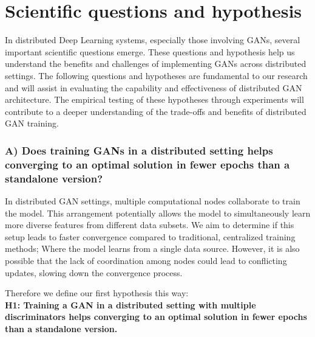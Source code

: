 \chapter{Scientific questions and hypothesis}
In distributed Deep Learning systems, especially those involving GANs, several important scientific questions emerge. These questions and hypothesis help us understand the benefits and challenges of implementing GANs across distributed settings. The following questions and hypotheses are fundamental to our research and will assist in evaluating the capability and effectiveness of distributed GAN architecture. The empirical testing of these hypotheses through experiments will contribute to a deeper understanding of the trade-offs and benefits of distributed GAN training.

\subsection*{A) Does training GANs in a distributed setting helps converging to an optimal solution in fewer epochs than a standalone version?} \label{que:a}
In distributed GAN settings, multiple computational nodes collaborate to train the model. This arrangement potentially allows the model to simultaneously learn more diverse features from different data subsets. We aim to determine if this setup leads to faster convergence compared to traditional, centralized training methods; Where the model learns from a single data source. However, it is also possible that the lack of coordination among nodes could lead to conflicting updates, slowing down the convergence process.

Therefore we define our first hypothesis this way:\\
\textbf{H1: Training a GAN in a distributed setting with multiple discriminators helps converging to an optimal solution in fewer epochs than a standalone version.}



